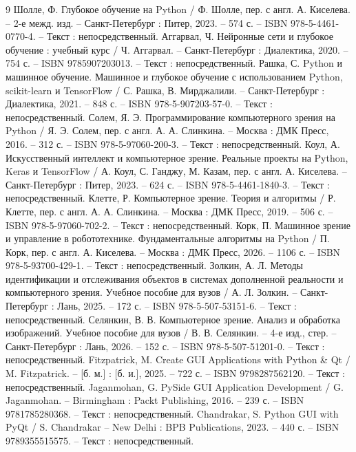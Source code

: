 \begin{thebibliography}{9}
	 Шолле, Ф. Глубокое обучение на Python / Ф. Шолле, пер. с англ. А. Киселева. -- 2-е межд. изд. -- Санкт-Петербург : Питер, 2023. -- 574 с. -- ISBN 978-5-4461-0770-4. -- Текст : непосредственный.
	 Аггарвал, Ч. Нейронные сети и глубокое обучение : учебный курс / Ч. Аггарвал. -- Санкт-Петербург : Диалектика, 2020. -- 754 с. -- ISBN 9785907203013. -- Текст : непосредственный.
	 Рашка, С. Python и машинное обучение. Машинное и глубокое обучение с использованием Python, scikit-learn и TensorFlow / С. Рашка, В. Мирджалили. -- Санкт-Петербург : Диалектика, 2021. -- 848 с. -- ISBN 978-5-907203-57-0. -- Текст : непосредственный.
	 Солем, Я. Э. Программирование компьютерного зрения на Python / Я. Э. Солем, пер. с англ. А. А. Слинкина. -- Москва : ДМК Пресс, 2016. -- 312 с. -- ISBN 978-5-97060-200-3. -- Текст : непосредственный.
	 Коул, А. Искусственный интеллект и компьютерное зрение. Реальные проекты на Python, Keras и TensorFlow / А. Коул, С. Ганджу, М. Казам, пер. с англ. А. Киселева. -- Санкт-Петербург : Питер, 2023. -- 624 с. -- ISBN 978-5-4461-1840-3. -- Текст : непосредственный.
	 Клетте, Р. Компьютерное зрение. Теория и алгоритмы / Р. Клетте, пер. с англ. А. А. Слинкина. -- Москва : ДМК Пресс, 2019. -- 506 с. -- ISBN 978-5-97060-702-2. -- Текст : непосредственный.
	 Корк, П. Машинное зрение и управление в робототехнике. Фундаментальные алгоритмы на Python / П. Корк, пер. с англ. А. Киселева. -- Москва : ДМК Пресс, 2026. -- 1106 с. -- ISBN 978-5-93700-429-1. -- Текст : непосредственный.
	 Золкин, А. Л. Методы идентификации и отслеживания объектов в системах дополненной реальности и компьютерного зрения. Учебное пособие для вузов / А. Л. Золкин. -- Санкт-Петербург : Лань, 2025. -- 172 с. -- ISBN 978-5-507-53151-6. -- Текст : непосредственный.
	 Селянкин, В. В. Компьютерное зрение. Анализ и обработка изображений. Учебное пособие для вузов / В. В. Селянкин. -- 4-е изд., стер. -- Санкт-Петербург : Лань, 2026. -- 152 с. -- ISBN 978-5-507-51201-0. -- Текст : непосредственный.
	 Fitzpatrick, M. Create GUI Applications with Python \& Qt / M. Fitzpatrick. -- [б. м.] : [б. и.], 2025. -- 722 с. -- ISBN 9798287562120. -- Текст : непосредственный. 
	 Jaganmohan, G. PySide GUI Application Development / G. Jaganmohan. -- Birmingham : Packt Publishing, 2016. -- 239 с. -- ISBN 9781785280368. -- Текст : непосредственный. 
	 Chandrakar, S. Python GUI with PyQt / S. Chandrakar -- New Delhi : BPB Publications, 2023. -- 440 с. -- ISBN 9789355515575. -- Текст : непосредственный.
	
\end{thebibliography}